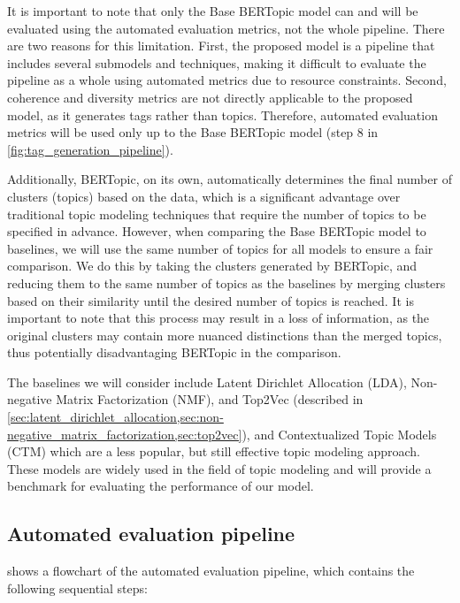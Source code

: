 It is important to note that only the Base BERTopic model can and will be evaluated using the automated evaluation metrics, not the whole pipeline. There are two reasons for this limitation. First, the proposed model is a pipeline that includes several submodels and techniques, making it difficult to evaluate the pipeline as a whole using automated metrics due to resource constraints. Second, coherence and diversity metrics are not directly applicable to the proposed model, as it generates tags rather than topics. Therefore, automated evaluation metrics will be used only up to the Base BERTopic model (step 8 in \cref{fig:tag_generation_pipeline}).

Additionally, BERTopic, on its own, automatically determines the final number of clusters (topics) based on the data, which is a significant advantage over traditional topic modeling techniques that require the number of topics to be specified in advance. However, when comparing the Base BERTopic model to baselines, we will use the same number of topics for all models to ensure a fair comparison. We do this by taking the clusters generated by BERTopic, and reducing them to the same number of topics as the baselines by merging clusters based on their similarity until the desired number of topics is reached. It is important to note that this process may result in a loss of information, as the original clusters may contain more nuanced distinctions than the merged topics, thus potentially disadvantaging BERTopic in the comparison.

The baselines we will consider include Latent Dirichlet Allocation (LDA), Non-negative Matrix Factorization (NMF), and Top2Vec (described in \cref{sec:latent_dirichlet_allocation,sec:non-negative_matrix_factorization,sec:top2vec}), and Contextualized Topic Models (CTM) \cite{bianchi_pre-training_2021, bianchi_cross-lingual_2021} which are a less popular, but still effective topic modeling approach. These models are widely used in the field of topic modeling and will provide a benchmark for evaluating the performance of our model.

\subsection{Automated evaluation pipeline}

 shows a flowchart of the automated evaluation pipeline, which contains the following sequential steps:

